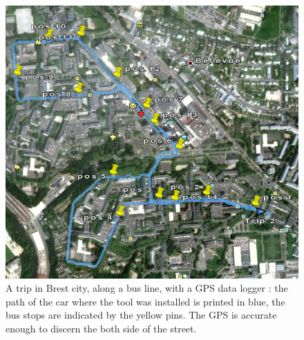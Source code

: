 \begin{figure}
\begin{center}
\includegraphics[width=12cm]{trip2.png}
\caption{A trip in Brest city, along a bus line, with a GPS data logger : 
the path of the car where the tool was installed is printed in blue, 
the bus stops are indicated by the yellow pins.
The GPS is accurate enough to discern the both side of the street.}
\label{fig:tripGPS}
\end{center}
\end{figure}


